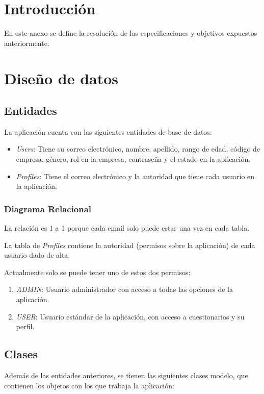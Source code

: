 
\section{Introducción}

En este anexo se define la resolución de las especificaciones y objetivos expuestos anteriormente.

\section{Diseño de datos}

\subsection{Entidades}
La aplicación cuenta con las siguientes entidades de base de datos:

\begin{itemize}
	\item \textit{Users}: Tiene su correo electrónico, nombre, apellido, rango de edad, código de empresa, género, rol en la empresa, contraseña y el estado en la aplicación.
	\item \textit{Profiles}: Tiene el correo electrónico y la autoridad que tiene cada usuario en la aplicación.
\end{itemize}
\subsubsection{Diagrama Relacional}

La relación es 1 a 1 porque cada email solo puede estar una vez en cada tabla.

La tabla de \textit{Profiles} contiene la autoridad (permisos sobre la aplicación) de cada usuario dado de alta.

Actualmente solo se puede tener uno de estos dos permisos:

\begin{enumerate}
	\item \textit{ADMIN}: Usuario administrador con acceso a todas las opciones de la aplicación.
	 \item \textit{USER}: Usuario estándar de la aplicación, con acceso a cuestionarios y su perfil.
\end{enumerate}


\subsection{Clases}
Además de las entidades anteriores, se tienen las siguientes clases modelo, que contienen los objetos con los que trabaja la aplicación:

